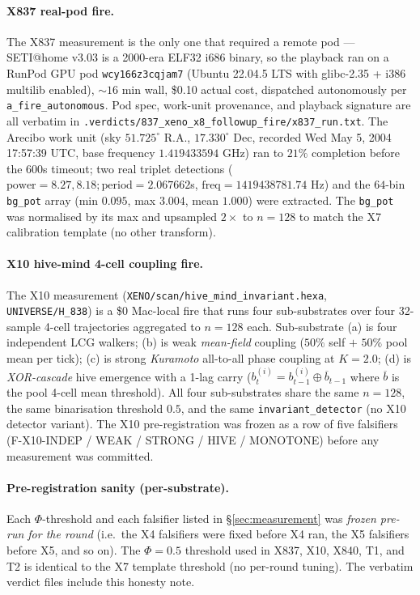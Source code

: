 \documentclass[11pt,a4paper]{article}
\begin{document}
\paragraph{X837 real-pod fire.}
The X837 measurement \citep{xeno_h837_setiathome} is the only one that
required a remote pod ---
SETI@home v3.03 is a 2000-era ELF32 i686 binary, so the playback ran on a
RunPod GPU pod \texttt{wcy166z3cqjam7} (Ubuntu 22.04.5 LTS with glibc-2.35
+ i386 multilib enabled), $\sim 16$ min wall, \$0.10 actual cost, dispatched
autonomously per \texttt{a\_fire\_autonomous}. Pod spec, work-unit
provenance, and playback signature are all verbatim in
\texttt{.verdicts/837\_xeno\_x8\_followup\_fire/x837\_run.txt}. The Arecibo
work unit (sky $51.725^\circ$ R.A., $17.330^\circ$ Dec, recorded
Wed May 5, 2004 17:57:39 UTC, base frequency $1.419433594$ GHz) ran to
$21\%$ completion before the $600$s timeout; two real triplet detections
($\text{power}=8.27, 8.18; \text{period}=2.067662$s,
$\text{freq}=1419438781.74$ Hz) and the $64$-bin \texttt{bg\_pot} array
(min $0.095$, max $3.004$, mean $1.000$) were extracted. The
\texttt{bg\_pot} was normalised by its max and upsampled $2\times$ to
$n=128$ to match the X7 calibration template (no other transform).

\paragraph{X10 hive-mind 4-cell coupling fire.}
The X10 measurement \citep{xeno_h838_x10}
(\texttt{XENO/scan/hive\_mind\_invariant.hexa},
\texttt{UNIVERSE/H\_838}) is a \$0 Mac-local fire that runs four
sub-substrates over four 32-sample 4-cell trajectories aggregated to
$n=128$ each. Sub-substrate (a) is four independent LCG walkers; (b) is
weak \emph{mean-field} coupling ($50\%$ self $+$ $50\%$ pool mean per
tick); (c) is strong \emph{Kuramoto} all-to-all phase coupling at
$K=2.0$; (d) is \emph{XOR-cascade} hive emergence with a 1-lag carry
($b^{(i)}_t = b^{(i)}_{t-1} \oplus \overline{b}_{t-1}$ where
$\overline{b}$ is the pool 4-cell mean threshold). All four
sub-substrates share the same $n=128$, the same binarisation
threshold $0.5$, and the same \texttt{invariant\_detector} (no X10
detector variant). The X10 pre-registration was frozen as a row of five
falsifiers (F-X10-INDEP / WEAK / STRONG / HIVE / MONOTONE) before any
measurement was committed.

\paragraph{Pre-registration sanity (per-substrate).}
Each $\Phi$-threshold and each falsifier listed in \S\ref{sec:measurement}
was \emph{frozen pre-run for the round} (i.e.\ the X4 falsifiers were
fixed before X4 ran, the X5 falsifiers before X5, and so on). The
$\Phi=0.5$ threshold used in X837, X10, X840, T1, and T2 is identical
to the X7 template threshold (no per-round tuning). The verbatim
verdict files include this honesty note.
\end{document}
